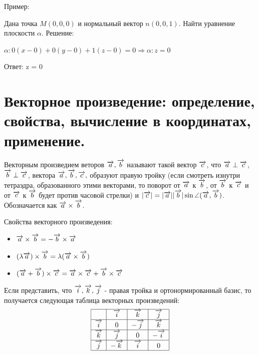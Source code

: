 \documentclass[12pt]{article}
\begin{document}
\begin{sloppypar}
    Пример:

    Дана точка $M(0, 0, 0)$ и нормальный вектор $n(0, 0, 1)$. Найти уравнение плоскости $\alpha$. Решение:

    $\alpha: 0(x - 0) + 0(y - 0) + 1(z - 0) = 0 \Rightarrow \alpha: z = 0$

    Ответ: z = 0


    \section{Векторное произведение: определение, свойства, вычисление в координатах, применение.}
    Векторным произведием веторов $\overrightarrow{a}, \overrightarrow{b}$ называют такой вектор $\overrightarrow{c}$, что $\overrightarrow{a} \perp \overrightarrow{c}$, $\overrightarrow{b} \perp \overrightarrow{c}$, вектора $\overrightarrow{a}, \overrightarrow{b}, \overrightarrow{c},$ образуют правую тройку (если смотреть изнутри тетраэдра, образованного этими векторами, то поворот от $\overrightarrow{a}$ к $\overrightarrow{b}$, от $\overrightarrow{b}$ к $\overrightarrow{c}$ и от $\overrightarrow{c}$ к $\overrightarrow{b}$ будет против часовой стрелки) и $|\overrightarrow{c}| = |\overrightarrow{a}||\overrightarrow{b}|\sin \angle(\overrightarrow{a}, \overrightarrow{b})$. Обозначается как $\overrightarrow{a} \times \overrightarrow{b}$.

    Свойства векторного произведения:
    \begin{itemize}
        \item $\overrightarrow{a} \times \overrightarrow{b} = - \overrightarrow{b} \times \overrightarrow{a}$
        \item $(\lambda \overrightarrow{a}) \times \overrightarrow{b} = \lambda (\overrightarrow{a} \times \overrightarrow{b})$
        \item $(\overrightarrow{a} + \overrightarrow{b}) \times \overrightarrow{c} = \overrightarrow{a} \times \overrightarrow{c} + \overrightarrow{b} \times \overrightarrow{c}$
    \end{itemize}

    Если представить, что $\overrightarrow{i}, \overrightarrow{k}, \overrightarrow{j}$ - правая тройка и ортонормированный базис, то получается следующая таблица векторных произведений:
    \[
        \begin{tabular}{|c|c|c|c|}
            \hline
                    & $\ol i$   & $\ol k$   & $\ol j$   \\
            \hline
            $\ol i$ & 0         & $ -\ol j$ & $ \ol k$  \\
            \hline
            $\ol k$ & $\ol j$   & 0         & $- \ol i$ \\
            \hline
            $\ol j$ & $- \ol k$ & $\ol i$   & $0$       \\
            \hline
        \end{tabular}
    \]


\end{sloppypar}
\end{document}
